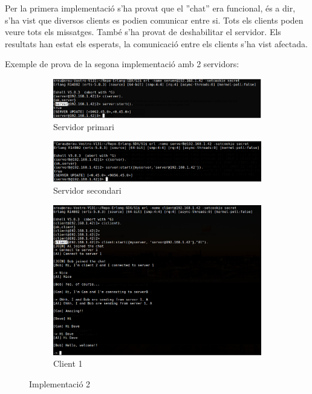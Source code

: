\documentclass[a4paper, 11pt]{article}
\begin{document}
Per la primera implementació s'ha provat que el ''chat'' era funcional, és a
dir, s'ha vist que diversos clients es podien comunicar entre si. Tots els
clients poden veure tots els missatges.  També s'ha provat de deshabilitar el
servidor. Els resultats han estat els esperats, la comunicació entre els clients
s'ha vist afectada.

Exemple de prova de la segona implementació amb 2 servidors:

\begin{figure}[H]
    \centering
    \begin{subfigure}[b]{0.8\textwidth}
        \includegraphics[width=1.0\textwidth]{figures/ServerA}
        \caption{Servidor primari}
        \label{fig:firstserver}
    \end{subfigure}
    
    \begin{subfigure}[b]{0.8\textwidth}
        \includegraphics[width=1.0\textwidth]{figures/ServerB}
        \caption{Servidor secondari}
        \label{fig:secondserver}
    \end{subfigure}

    \begin{subfigure}[b]{0.8\textwidth}
        \includegraphics[width=1.0\textwidth]{figures/Al}
        \caption{Client 1}
        \label{fig:firstclient}
    \end{subfigure}

    \caption{Implementació 2}
\end{figure}
\end{document}
